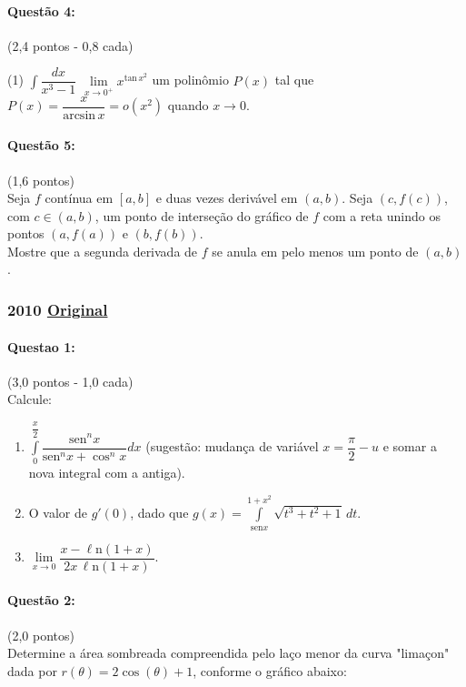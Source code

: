 \documentclass[12pt,a4paper]{article}
\newcommand{\sen}{\mathrm{sen}}
\newcommand{\Ln}{\ell\mathrm{n}}
\newcommand{\original}[1]{\tiny \href{#1}{Original} \normalsize}
\begin{document}
\paragraph{Questão 4:}(2,4 pontos - 0,8 cada)
\begin{tasks}(1)
\task $\displaystyle\int\dfrac{dx}{x^3-1}$
\task $\lim\limits_{x \to 0^+}x^{\mathrm{tan}\,x^2}$
\task um polinômio $P(x)$ tal que $P(x)=\dfrac{x}{\mathrm{arcsin}\,x}=o\left( x^2 \right)$ quando $x \to 0$.
\end{tasks}

\paragraph{Questão 5:}(1,6 pontos)\\
Seja $f$ contínua em $[a,b]$ e duas vezes derivável em $(a,b)$. Seja $(c,f(c))$, com $c \in (a,b)$, um ponto de interseção do gráfico de $f$ com a reta unindo os pontos $(a,f(a))$ e $(b,f(b))$.\\
Mostre que a segunda derivada de $f$ se anula em pelo menos um ponto de $(a,b)$.

\newpage

\subsubsection{2010 \original{https://drive.google.com/open?id=1ty9bN1897Q0qARDPph3qTqZR-bZ3cO_m}}

\paragraph{Questao 1:}(3,0 pontos - 1,0 cada)\\
Calcule:
\begin{enumerate}[label=(\alph*)]
\item $\displaystyle\int\limits_{0}^{\dfrac{x}{2}}\dfrac{\sen ^nx}{\sen ^nx+\cos^nx}dx$ (sugestão: mudança de variável $x=\dfrac{\pi}{2}-u$ e somar a nova integral com a antiga). 
\item O valor de $g'(0)$, dado que $g(x)=\displaystyle\int\limits_{\sen x}^{1+x^2}\sqrt{t^3+t^2+1}\,dt$.
\item $\lim\limits_{x \to 0}\dfrac{x-\Ln (1+x)}{2x\,\Ln(1+x)}$.
\end{enumerate}
\paragraph{Questão 2:}(2,0 pontos)\\
Determine a área sombreada compreendida pelo laço menor da curva "limaçon" dada por $r(\theta)=2\cos(\theta)+1$, conforme o gráfico abaixo:
\end{document}
